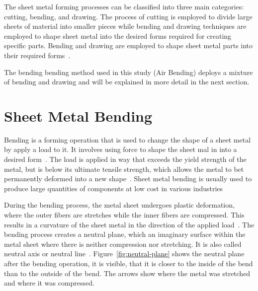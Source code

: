 The sheet metal forming processes can be classified into three main categories:
cutting, bending, and drawing.
The process of cutting is employed to divide large sheets of material into smaller pieces while bending and drawing
techniques are employed to shape sheet metal into the desired forms required for creating specific parts.
Bending and drawing are employed to shape sheet metal parts
into their required forms~\cite[p. 405]{groover_fundamentalsmodernmanufacturing_2020}.

The bending bending method used in this study (Air Bending) deploys a mixture of bending and drawing and will be
explained in more detail in the next section.


\section{Sheet Metal Bending}\label{sec:bending}
Bending is a forming operation that is used to change the shape of a sheet metal by
apply a load to it.
It involves using force to shape the sheet mal in into a desired form~\cite[p. 1]{dib_singleensembleclassifiers_2020}.
The load is applied in way that exceeds the yield strength of the metal, but is below its
ultimate tensile strength, which allows the metal to bet permanently deformed into a
new shape~\cite[p. 1]{baig_machinelearningprediction_2021}.
Sheet metal bending is usually used to produce large quantities of components at low cost in various
industries~\cite[p. 1]{dib_singleensembleclassifiers_2020}

During the bending process, the metal sheet undergoes plastic deformation, where the outer fibers are stretches while
the inner fibers are compressed.
This results in a curvature of the sheet metal in the direction of the applied
load~\cite[p. 3]{baig_machinelearningprediction_2021}.
The bending process creates a neutral plane, which an imaginary surface within the metal sheet where there is
neither compression nor stretching. It is also called neutral axis or neutral
line~\cite[pp. 67]{gustafson1998analytical}.
Figure~\ref{fig:neutral-plane} shows the neutral plane after the bending operation, it is
visible, that it is closer to the inside of the bend than to the outside of the bend.
The arrows show where the metal was stretched and where it was compressed.



